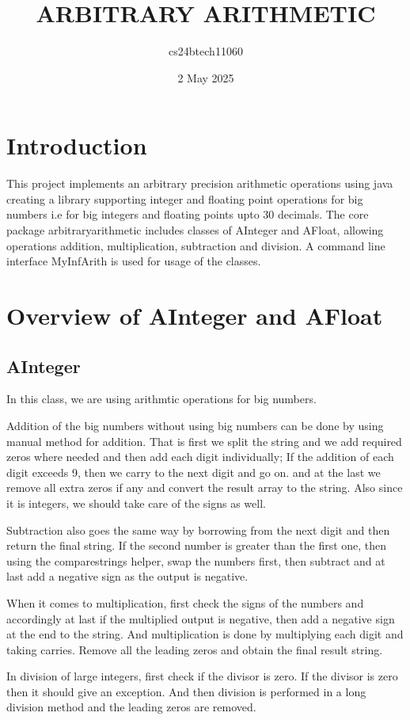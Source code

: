 \documentclass{article}
\author{cs24btech11060 }
\date{2 May 2025}
\begin{document}
\title{ARBITRARY ARITHMETIC}
\maketitle
\section{Introduction}
This project implements an arbitrary precision arithmetic operations using java creating a library supporting integer and floating point operations for big numbers i.e for big integers and floating points upto 30 decimals. The core package arbitraryarithmetic includes classes of AInteger and AFloat, allowing operations addition, multiplication, subtraction and division. A command line interface MyInfArith is used for usage of the classes.
\section{Overview of AInteger and AFloat}
\subsection{AInteger}
In this class, we are using arithmtic operations for big numbers.

Addition of the big numbers without using big numbers can be done by using manual method for addition. That is first we split the string and we add required zeros where needed and then add each digit individually; If the addition of each digit exceeds 9, then we carry to the next digit and go on. and at the last we remove all extra zeros if any and convert the result array to the string. Also since it is integers, we should take care of the signs as well.

Subtraction also goes the same way by borrowing from the next digit and then return the final string. If the second number is greater than the first one, then using the comparestrings helper, swap the numbers first, then subtract and at last add a negative sign as the output is negative. 

When it comes to multiplication, first check the signs of the numbers and accordingly at last if the multiplied output is negative, then add a negative sign at the end to the string. And multiplication is done by multiplying each digit and taking carries. Remove all the leading zeros and obtain the final result string.

In division of large integers, first check if the divisor is zero. If the divisor is zero then it should give an exception. And then division is performed in a long division method and the leading zeros are removed.
\end{document}
